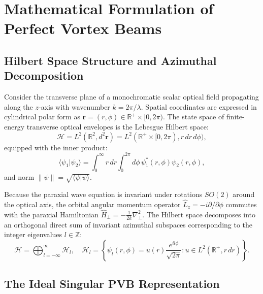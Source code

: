 \documentclass[11pt,a4paper]{article}
\begin{document}
\section{Mathematical Formulation of Perfect Vortex Beams}
\label{sec:formulation}

\subsection{Hilbert Space Structure and Azimuthal Decomposition}

Consider the transverse plane of a monochromatic scalar optical field propagating along the $z$-axis with wavenumber $k = 2\pi / \lambda$. Spatial coordinates are expressed in cylindrical polar form as $\mathbf{r} = (r, \phi) \in \mathbb{R}^+ \times [0, 2\pi)$. The state space of finite-energy transverse optical envelopes is the Lebesgue Hilbert space:
\begin{equation}
\mathcal{H} = L^2(\mathbb{R}^2, d^2\mathbf{r}) = L^2(\mathbb{R}^+ \times [0, 2\pi), r \, dr \, d\phi),
\end{equation}
equipped with the inner product:
\begin{equation}
\langle \psi_1 | \psi_2 \rangle = \int_0^\infty r \, dr \int_0^{2\pi} d\phi \, \psi_1^*(r, \phi) \psi_2(r, \phi),
\label{eq:inner_product_def}
\end{equation}
and norm $\|\psi\| = \sqrt{\langle \psi | \psi \rangle}$.

Because the paraxial wave equation is invariant under rotations $SO(2)$ around the optical axis, the orbital angular momentum operator $\hat{L}_z = -i \partial / \partial \phi$ commutes with the paraxial Hamiltonian $\hat{H}_\perp = -\frac{1}{2k} \nabla_\perp^2$. The Hilbert space decomposes into an orthogonal direct sum of invariant azimuthal subspaces corresponding to the integer eigenvalues $l \in \mathbb{Z}$:
\begin{equation}
\mathcal{H} = \bigoplus_{l=-\infty}^\infty \mathcal{H}_l, \quad \mathcal{H}_l = \left\{ \psi_l(r, \phi) = u(r) \frac{e^{i l \phi}}{\sqrt{2\pi}} : u \in L^2(\mathbb{R}^+, r \, dr) \right\}.
\end{equation}

\subsection{The Ideal Singular PVB Representation}
\end{document}
